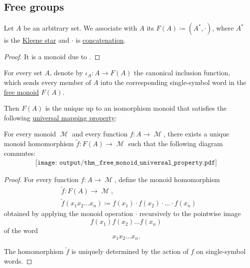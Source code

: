 \subsection{Free groups}\label{subsec:free_groups}

\begin{definition}\label{def:free_monoid}
  Let \( A \) be an arbitrary set. We associate with \( A \) its  \( F(A) \coloneqq (A^*, \cdot) \), where \( A^* \) is the \hyperref[def:formal_language/kleene_star]{Kleene star} and \( \cdot \) is \hyperref[def:formal_language/concatenation]{concatenation}.
\end{definition}
\begin{proof}
  It is a monoid due to .
\end{proof}

\begin{proposition}\label{thm:free_monoid_universal_property}
  For every set \( A \), denote by \( \iota_A: A \to F(A) \) the canonical inclusion function, which sends every member of \( A \) into the corresponding single-symbol word in the \hyperref[def:free_monoid]{free monoid} \( F(A) \).

  Then \( F(A) \) is the unique up to an isomorphism monoid that satisfies the following \hyperref[rem:universal_mapping_property]{universal mapping property}:
  \begin{displayquote}
    For every monoid \( \mscrM \) and every function \( f: A \to \mscrM \), there exists a unique monoid homomorphism \( \widetilde{f}: F(A) \to \mscrM \) such that the following diagram commutes:
    \begin{equation}\label{eq:thm:free_monoid_universal_property/diagram}
      \begin{aligned}
        \texttt{[image: output/thm\_\_free\_monoid\_universal\_property.pdf]}
      \end{aligned}
    \end{equation}
  \end{displayquote}
\end{proposition}
\begin{proof}
  For every function \( f: A \to \mscrM \), define the monoid homomorphism
  \begin{equation*}
    \begin{aligned}
      &\widetilde{f}: F(A) \to \mscrM, \\
      &\widetilde{f}(x_1 x_2 \ldots x_n) \coloneqq f(x_1) \cdot f(x_2) \cdot \ldots \cdot f(x_n)
    \end{aligned}
  \end{equation*}
  obtained by applying the monoid operation \( \cdot \) recursively to the pointwise image
  \begin{equation*}
    f(x_1) f(x_2) \ldots f(x_n)
  \end{equation*}
  of the word
  \begin{equation*}
    x_1 x_2 \ldots x_n.
  \end{equation*}

  The homomorphism \( \widetilde{f} \) is uniquely determined by the action of \( f \) on single-symbol words.
\end{proof}

